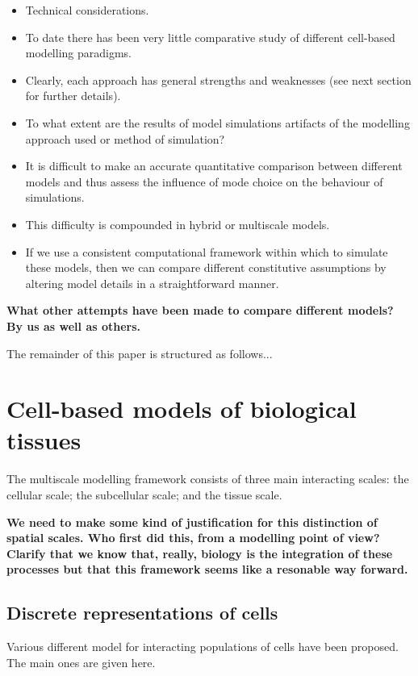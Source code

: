 \documentclass{siamltex}
\newcommand{\highlight}[1]{{\color{red} \bf{#1}}}
\begin{document}
\begin{itemize}
\item Technical considerations.
\item To date there has been very little comparative study of different cell-based modelling paradigms.
\item Clearly, each approach has general strengths and weaknesses (see next section for further details).
\item To what extent are the results of model simulations artifacts of the modelling approach used or method of simulation?
\item It is difficult to make an accurate quantitative comparison between different models and thus assess the influence of mode choice on the behaviour of simulations.
\item This difficulty is compounded in hybrid or multiscale models.
\item If we use a consistent computational framework within which to simulate these models, then we can compare different constitutive assumptions by altering model details in a straightforward manner.
\end{itemize}

\highlight{What other attempts have been made to compare different models? By us \cite{Osborne2010Hybrid} as well as others.}

The remainder of this paper is structured as follows...

\section{Cell-based models of biological tissues}\label{sec:discrete_models}
The multiscale modelling framework consists of three main interacting scales: the cellular scale; the subcellular scale; and the tissue scale.

\highlight{We need to make some kind of justification for this distinction of spatial scales. Who first did this, from a modelling point of view? Clarify that we know that, really, biology is the integration of these processes but that this framework seems like a resonable way forward.}

\subsection{Discrete representations of cells} \label{sec:cell_level}
Various different model for interacting populations of cells have been proposed. The main ones are given here.
\end{document}
